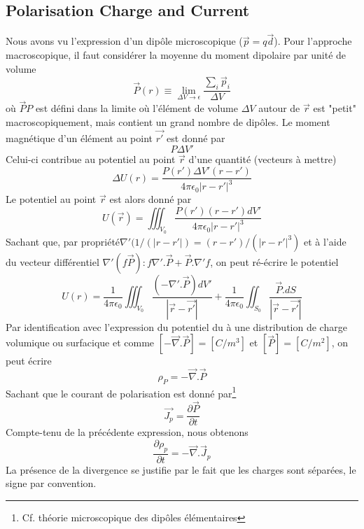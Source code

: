 \subsection{Polarisation Charge and Current}
Nous avons vu l'expression d'un dipôle microscopique ($\vec p = q\vec d$). Pour l'approche
macroscopique, il faut considérer la moyenne du moment dipolaire par unité de volume
\begin{equation}
\vec P(r) \equiv \lim\limits_{\Delta V\to \epsilon} \dfrac{\sum_i \vec p_i}{\Delta V}
\end{equation}
où $\vec PP$ est défini dans la limite où l'élément de volume $\Delta V$ autour de $\vec r$
est "petit" macroscopiquement, mais contient un grand nombre de dipôles. Le moment magnétique
d'un élément au point $\vec{r'}$ est donné par
\begin{equation}
P\Delta V'
\end{equation}
Celui-ci contribue au potentiel au point $\vec{r}$ d'une quantité (vecteurs à mettre)
\begin{equation}
\Delta U(r) = \frac{P(r')\Delta V'(r-r')}{4\pi\epsilon_0|r-r'|^3}
\end{equation}
Le potentiel au point $\vec{r}$ est alors donné par
\begin{equation}
U(\vec{r}) = \iiint_{V_0} \frac{P(r')(r-r')dV'}{4\pi\epsilon_0|r-r'|^3}
\end{equation}
Sachant que, par propriété$\nabla'(1/(|r-r'|)= (r-r')/(|r-r'|^3)$ et à l'aide du vecteur
différentiel $\nabla'(f\vec{P}) : f\nabla'.\vec{P}+\vec{P}.\nabla' f$, on peut ré-écrire le
potentiel
\begin{equation}
U(r) = \frac{1}{4\pi\epsilon_0}\iiint_{V_0} \dfrac{(-\nabla'.\vec{P})dV'}{|\vec{r}-\vec{r'}|} +
\frac{1}{4\pi\epsilon_0}\iint_{S_0}\dfrac{\vec{P}.dS}{|\vec{r}-\vec{r'}|}
\end{equation}
Par identification avec l'expression du potentiel du à une distribution de charge volumique ou 
surfacique et comme $[-\vec\nabla .\vec{P}] = [C/m^3]$ et $[\vec{P}] = [C/m^2]$, on peut écrire
\begin{equation}
\rho_P = -\vec\nabla .\vec{P}
\end{equation}
Sachant que le courant de polarisation est donné par\footnote{Cf. théorie microscopique des 
dipôles élémentaires}
\begin{equation}
\vec{J_p} = \dfrac{\partial\vec{P}}{\partial t}
\end{equation}
Compte-tenu de la précédente expression, nous obtenons
\begin{equation}
\dfrac{\partial\rho_p}{\partial t} = -\vec\nabla.\vec{J}_p
\end{equation}
La présence de la divergence se justifie par le fait que les charges sont séparées, le signe 
par convention. 

